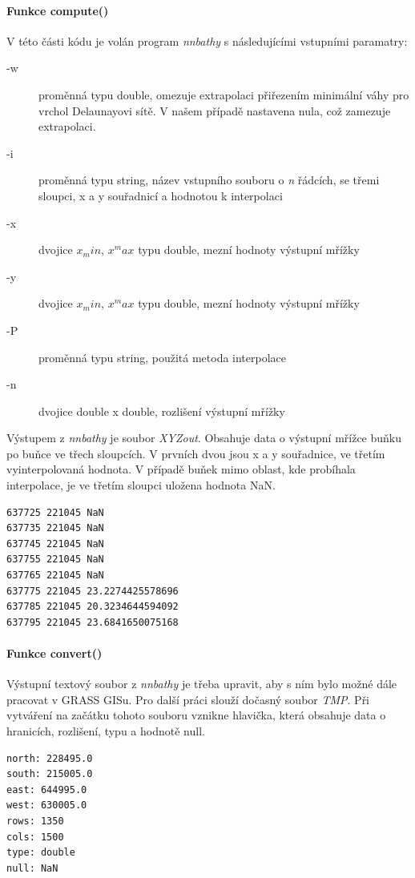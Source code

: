 \documentclass[12pt,a4paper]{article}
\begin{document}
\bigskip
\paragraph{Funkce compute()}
V této části kódu je volán program \textit{nnbathy} s následujícími vstupními paramatry:
\begin{description}
\item[-w]{proměnná typu double, omezuje extrapolaci přiřezením minimální váhy pro vrchol Delaunayovi sítě. V našem případě nastavena nula, což zamezuje extrapolaci.}
\item[-i]{proměnná typu string, název vstupního souboru o \textit{n} řádcích, se třemi sloupci, x a y souřadnicí a hodnotou k interpolaci}
\item[-x]{dvojice $x_min$, $x^max$ typu double, mezní hodnoty výstupní mřížky}
\item[-y]{dvojice $x_min$, $x^max$ typu double, mezní hodnoty výstupní mřížky}
\item[-P]{proměnná typu string, použitá metoda interpolace}
\item[-n]{dvojice double x double, rozlišení výstupní mřížky}
\end{description}

Výstupem z \textit{nnbathy} je soubor \textit{XYZout}. Obsahuje data o výstupní mřížce buňku po buňce ve třech sloupcích. V prvních dvou jsou x a y souřadnice, ve třetím vyinterpolovaná hodnota. V případě buňek mimo oblast, kde probíhala interpolace, je ve třetím sloupci uložena hodnota NaN.

\bigskip
\lstset{basicstyle=\footnotesize}
\begin{lstlisting}[caption={XYZout}]
637725 221045 NaN
637735 221045 NaN
637745 221045 NaN
637755 221045 NaN
637765 221045 NaN
637775 221045 23.2274425578696
637785 221045 20.3234644594092
637795 221045 23.6841650075168
\end{lstlisting}

\bigskip
\paragraph{Funkce convert()}
Výstupní textový soubor z \textit{nnbathy} je třeba upravit, aby s ním bylo možné dále pracovat v GRASS GISu. Pro další práci slouží dočasný soubor \textit{TMP}. Při vytváření na začátku tohoto souboru vznikne hlavička, která obsahuje data o hranicích, rozlišení, typu a hodnotě null.

\bigskip
\lstset{basicstyle=\ttfamily}
\begin{lstlisting}[caption={Hlavička souboru TMP}]
north: 228495.0
south: 215005.0
east: 644995.0
west: 630005.0
rows: 1350
cols: 1500
type: double
null: NaN
\end{lstlisting}
\end{document}
